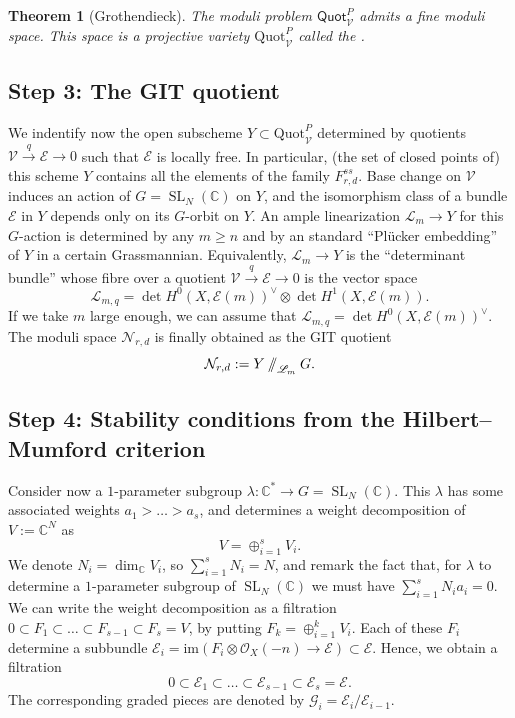 \documentclass[12pt,a4paper]{amsbook}
\newtheorem{thm}{Theorem}[chapter]
\theoremstyle{remark} \newtheorem{rmk}[thm]{Remark}
\theoremstyle{definition} \newtheorem{defn}[thm]{Definition}
\theoremstyle{definition} \newtheorem{ex}[thm]{Example}
\theoremstyle{definition} \newtheorem{ej}{Exercise}
\let\emph\relax
\newcommand{\git}{\mathbin{/\mkern-6mu/}}
\newcommand{\C}{\mathbb C}
\newcommand{\cN}{\mathcal N}
\newcommand{\sO}{\mathscr O}
\newcommand{\sE}{\mathscr E}
\newcommand{\sL}{\mathscr L}
\newcommand{\sG}{\mathscr G}
\newcommand{\sV}{\mathscr V}
\DeclareMathOperator{\SL}{SL}
\begin{document}
\begin{thm}[Grothendieck]
The moduli problem $\mathsf{Quot}^P_{\sV}$ admits a fine moduli space. This space is a projective variety $\mathrm{Quot}^P_{\sV}$ called the \emph{Quot scheme}.
\end{thm}

\subsection*{Step 3: The GIT quotient}
We indentify now the open subscheme $Y\subset \mathrm{Quot}^P_{\sV}$ determined by quotients $\sV \overset{q}{\rightarrow} \sE \rightarrow 0$ such that $\sE$ is locally free. In particular, (the set of closed points of) this scheme $Y$ contains all the elements of the family $F_{r,d}^{ss}$. Base change on $\sV$ induces an action of $G=\SL_N(\C)$ on $Y$, and the isomorphism class of a bundle $\sE$ in $Y$ depends only on its $G$-orbit on $Y$. An ample linearization $\sL_m \rightarrow Y$ for this $G$-action is determined by any $m\geq n$ and by an standard ``Plücker embedding'' of $Y$ in a certain Grassmannian. Equivalently, $\sL_m \rightarrow Y$ is the ``determinant bundle'' whose fibre over a quotient $\sV \overset{q}{\rightarrow} \sE \rightarrow 0$ is the vector space \[\sL_{m,q}=\det H^0(X,\sE(m))^\vee \otimes \det H^1(X,\sE(m)).\]
If we take $m$ large enough, we can assume that $\sL_{m,q}=\det H^0(X,\sE(m))^\vee$.
The moduli space $\cN_{r,d}$ is finally obtained as the GIT quotient
\begin{equation*}
\cN_{r,d} := Y \git_{\sL_m} G.
\end{equation*}

\subsection*{Step 4: Stability conditions from the Hilbert--Mumford criterion}
Consider now a $1$-parameter subgroup $\lambda:\C^* \rightarrow G=\SL_N(\C)$. This $\lambda$ has some associated weights $a_1>\dots >a_s$, and determines a weight decomposition of $V:=\C^N$ as
\begin{equation*}
V = \oplus_{i=1}^s V_{i}.
\end{equation*}
We denote $N_i=\dim_\C V_i$, so $\sum_{i=1}^s N_i = N$, and remark the fact that, for $\lambda$ to determine a $1$-parameter subgroup of $\SL_N(\C)$ we must have $\sum_{i=1}^s N_i a_i=0$.
We can write the weight decomposition as a filtration $0\subset F_1 \subset \dots \subset F_{s-1} \subset F_s=V$, by putting $F_k  = \oplus_{i=1}^k V_i$.
Each of these $F_i$ determine a subbundle $\sE_i = \mathrm{im}(F_i \otimes \sO_X(-n)\rightarrow \sE) \subset \sE$. Hence, we obtain a filtration \[0\subset \sE_1 \subset \dots \subset \sE_{s-1}\subset \sE_s=\sE.\]
The corresponding graded pieces are denoted by $\sG_i = \sE_i/\sE_{i-1}$.
\end{document}
